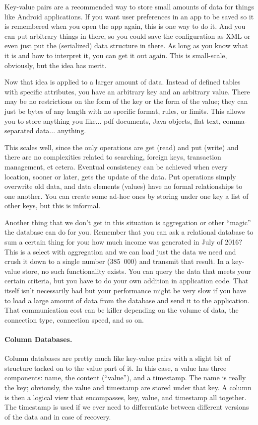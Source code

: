 Key-value pairs are a recommended way to store small amounts of data for things like Android applications. If you want user preferences in an app to be saved so it is remembered when you open the app again, this is one way to do it. And you can put arbitrary things in there, so you could save the configuration as XML or even just put the (serialized) data structure in there. As long as you know what it is and how to interpret it, you can get it out again. This is small-scale, obviously, but the idea has merit.

Now that idea is applied to a larger amount of data. Instead of defined tables with specific attributes, you have an arbitrary key and an arbitrary value. There may be no restrictions on the form of the key or the form of the value; they can just be  bytes of any length with no specific format, rules, or limits. This allows you to store anything you like... pdf documents, Java objects, flat text, comma-separated data... anything.

This scales well, since the only operations are get (read) and put (write) and there are no complexities related to searching, foreign keys, transaction management, et cetera. Eventual consistency can be achieved when every location, sooner or later, gets the update of the data. Put operations simply overwrite old data, and data elements (values) have no formal relationships to one another. You can create some ad-hoc ones by storing under one key a list of other keys, but this is informal.

Another thing that we don't get in this situation is aggregation or other ``magic'' the database can do for you. Remember that you can ask a relational database to sum a certain thing for you: how much income was generated in July of 2016? This is a select with aggregation and we can load just the data we need and crush it down to a single number (385~000) and transmit that result. In a key-value store, no such functionality exists. You can query the data that meets your certain criteria, but you have to do your own addition in application code. That itself isn't necessarily bad but your performance might be very slow if you have to load a large amount of data from the database and send it to the application. That communication cost can be killer depending on the volume of data, the connection type, connection speed, and so on.

\paragraph{Column Databases.}
Column databases are pretty much like key-value pairs with a slight bit of structure tacked on to the value part of it. In this case, a value has three components: name, the content (``value''), and a timestamp. The name is really the key; obviously, the value and timestamp are stored under that key. A column is then a logical view that encompasses, key, value, and timestamp all together. The timestamp is used if we ever need to differentiate between different versions of the data and in case of recovery.

